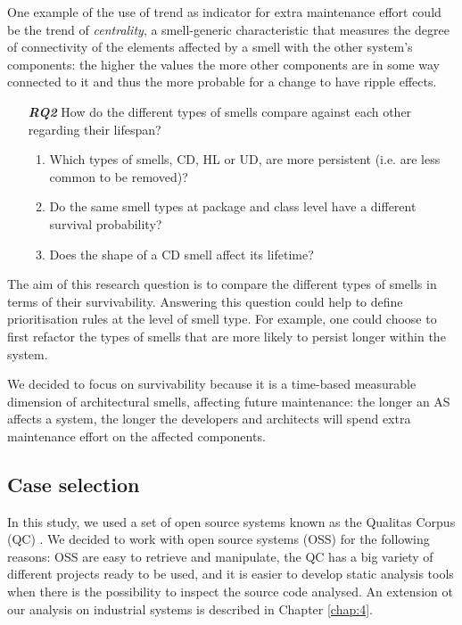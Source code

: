 One example of the use of trend as indicator for extra maintenance effort could be the trend of \emph{centrality}, a smell-generic characteristic that measures the degree of connectivity of the elements affected by a smell with the other system's components: the higher the values the more other components are in some way connected to it and thus the more probable for a change to have ripple effects.

\begin{enumerate}
    \item[\textbf{\textit{RQ2}}] How do the different types of smells compare against each other regarding their lifespan?
    \begin{enumerate}
        \item Which types of smells, CD, HL or UD, are more persistent (i.e. are less common to be removed)?
        \item Do the same smell types at package and class level have a different survival probability?
        \item Does the shape of a CD smell affect its lifetime?
    \end{enumerate}
\end{enumerate}
The aim of this research question is to compare the different types of smells in terms of their survivability. Answering this question could help to define prioritisation rules at the level of smell type.
For example, one could choose to first refactor the types of smells that are more likely to persist longer within the system.

We decided to focus on survivability because it is a time-based measurable dimension of architectural smells, affecting future maintenance: the longer an AS affects a system, the longer the developers and architects will spend extra maintenance effort on the affected components.

\subsection{Case selection}
In this study, we used a set of open source systems known as the Qualitas Corpus (QC) \cite{QualitasCorpus2010}.
We decided to work with open source systems (OSS) for the following reasons: OSS are easy to retrieve and manipulate, the QC has a big variety of different projects ready to be used, and it is easier to develop static analysis tools when there is the possibility to inspect the source code analysed. An extension ot our analysis on industrial systems is described in Chapter \ref{chap:4}.

